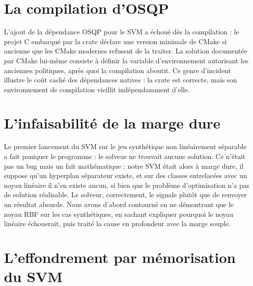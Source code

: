 \documentclass[11pt,a4paper]{report}
\begin{document}
\hypertarget{la-compilation-dosqp}{%
\section{La compilation d'OSQP}\label{la-compilation-dosqp}}

L'ajout de la dépendance OSQP pour le SVM a échoué dès la compilation :
le projet C embarqué par la crate déclare une version minimale de CMake
si ancienne que les CMake modernes refusent de la traiter. La solution
documentée par CMake lui-même consiste à définir la variable
d'environnement autorisant les anciennes politiques, après quoi la
compilation aboutit. Ce genre d'incident illustre le coût caché des
dépendances natives : la crate est correcte, mais son environnement de
compilation vieillit indépendamment d'elle.

\hypertarget{linfaisabilituxe9-de-la-marge-dure}{%
\section{L'infaisabilité de la marge
dure}\label{linfaisabilituxe9-de-la-marge-dure}}

Le premier lancement du SVM sur le jeu synthétique non linéairement
séparable a fait paniquer le programme : le solveur ne trouvait aucune
solution. Ce n'était pas un bug mais un fait mathématique : notre SVM
était alors à marge dure, il suppose qu'un hyperplan séparateur existe,
et sur des classes entrelacées avec un noyau linéaire il n'en existe
aucun, si bien que le problème d'optimisation n'a pas de solution
réalisable. Le solveur, correctement, le signale plutôt que de renvoyer
un résultat absurde. Nous avons d'abord contourné en ne démontrant que
le noyau RBF sur les cas synthétiques, en sachant expliquer pourquoi le
noyau linéaire échouerait, puis traité la cause en profondeur avec la
marge souple.

\hypertarget{leffondrement-par-muxe9morisation-du-svm}{%
\section{L'effondrement par mémorisation du
SVM}\label{leffondrement-par-muxe9morisation-du-svm}}
\end{document}
